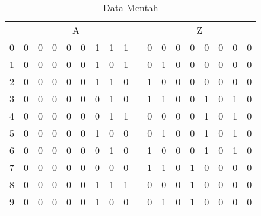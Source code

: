 \begin{table}[H]
	\centering
	\caption{Data Mentah}
	\label{tab:rawdata}%
	\begin{tabular}{|c|c|c|c|c|c|c|c|c|c|c|c|c|c|c|c|c|c|}
		\hline
		\rowcolor[rgb]{ .949,  .949,  .949} \multicolumn{18}{|c|}{REG} \bigstrut\\
		\hline
		\rowcolor[rgb]{ .949,  .949,  .949} \multicolumn{1}{|p{2.145em}|}{CLK} & \multicolumn{8}{c|}{A}                                        &       & \multicolumn{8}{c|}{Z} \bigstrut\\
		\hline
		0     & 0     & 0     & 0     & 0     & 0     & 1     & 1     & 1     & \multirow{19}[38]{*}{} & 0     & 0     & 0     & 0     & 0     & 0     & 0     & 0 \bigstrut\\
		\cline{1-9}\cline{11-18}    1     & 0     & 0     & 0     & 0     & 0     & 1     & 0     & 1     &       & 0     & 1     & 0     & 0     & 0     & 0     & 0     & 0 \bigstrut\\
		\cline{1-9}\cline{11-18}    2     & 0     & 0     & 0     & 0     & 0     & 1     & 1     & 0     &       & 1     & 0     & 0     & 0     & 0     & 0     & 0     & 0 \bigstrut\\
		\cline{1-9}\cline{11-18}    3     & 0     & 0     & 0     & 0     & 0     & 0     & 1     & 0     &       & 1     & 1     & 0     & 0     & 1     & 0     & 1     & 0 \bigstrut\\
		\cline{1-9}\cline{11-18}    4     & 0     & 0     & 0     & 0     & 0     & 0     & 1     & 1     &       & 0     & 0     & 0     & 0     & 1     & 0     & 1     & 0 \bigstrut\\
		\cline{1-9}\cline{11-18}    5     & 0     & 0     & 0     & 0     & 0     & 1     & 0     & 0     &       & 0     & 1     & 0     & 0     & 1     & 0     & 1     & 0 \bigstrut\\
		\cline{1-9}\cline{11-18}    6     & 0     & 0     & 0     & 0     & 0     & 0     & 1     & 0     &       & 1     & 0     & 0     & 0     & 1     & 0     & 1     & 0 \bigstrut\\
		\cline{1-9}\cline{11-18}    7     & 0     & 0     & 0     & 0     & 0     & 0     & 0     & 0     &       & 1     & 1     & 0     & 1     & 0     & 0     & 0     & 0 \bigstrut\\
		\cline{1-9}\cline{11-18}    8     & 0     & 0     & 0     & 0     & 0     & 1     & 1     & 1     &       & 0     & 0     & 0     & 1     & 0     & 0     & 0     & 0 \bigstrut\\
		\cline{1-9}\cline{11-18}    9     & 0     & 0     & 0     & 0     & 0     & 1     & 0     & 0     &       & 0     & 1     & 0     & 1     & 0     & 0     & 0     & 0 \bigstrut\\

\end{tabular}
\end{table}
